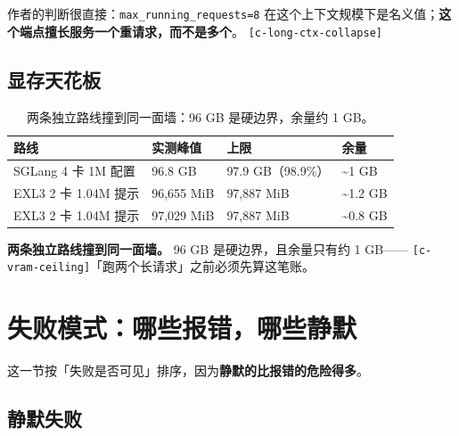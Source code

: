 作者的判断很直接：\texttt{max\_running\_requests=8} 在这个上下文规模下是名义值；\textbf{这个端点擅长服务一个重请求，而不是多个}。 {\scriptsize\texttt{[c-\hspace{0pt}long-\hspace{0pt}ctx-\hspace{0pt}collapse]}}


\subsection{显存天花板}

\begin{table}[t]
\centering
\footnotesize
\setlength{\tabcolsep}{4pt}
\caption{两条独立路线撞到同一面墙：96 GB 是硬边界，余量约 1 GB。}
\label{tab:12}
\begin{tabular}{llll}
\toprule
路线 & 实测峰值 & 上限 & 余量 \\
\midrule
SGLang 4 卡 1M 配置 & 96.8 GB & 97.9 GB（98.9\%） & \textasciitilde{}1 GB \\
EXL3 2 卡 1.04M 提示 & 96,655 MiB & 97,887 MiB & \textasciitilde{}1.2 GB \\
EXL3 2 卡 1.04M 提示 & 97,029 MiB & 97,887 MiB & \textasciitilde{}0.8 GB \\
\bottomrule
\end{tabular}
\end{table}

\textbf{两条独立路线撞到同一面墙。} 96 GB 是硬边界，且余量只有约 1 GB—— {\scriptsize\texttt{[c-\hspace{0pt}vram-\hspace{0pt}ceiling]}}「跑两个长请求」之前必须先算这笔账。



\section{失败模式：哪些报错，哪些静默}

这一节按「失败是否可见」排序，因为\textbf{静默的比报错的危险得多}。


\subsection{静默失败}

